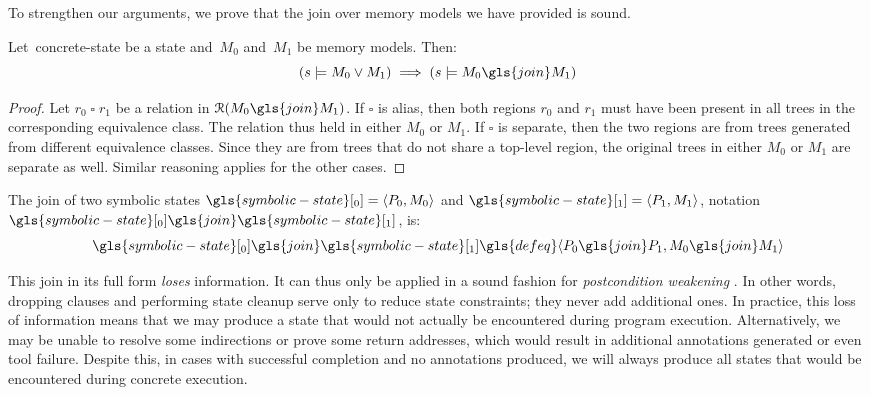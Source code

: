 To strengthen our arguments, we prove that the join over memory models we have provided is sound.
\begin{lemma}\label{lem:mem_soundness}
  Let~\gls{concrete-state} be a state and~$M_0$ and~$M_1$ be memory models. Then:
  \begin{equation*}
    (s\models M_0 \lor M_1) \implies (s\models M_0\gls{join}M_1)
  \end{equation*}
\end{lemma}
\begin{proof}
  Let $r_0\mathbin{\square}r_1$ be a relation in $\mathcal{R}(M_0\gls{join}M_1)$.
  If $\square$ is \gls{alias}, then both regions $r_0$ and $r_1$ must have been present in all trees in the corresponding equivalence class.
  The relation thus held in either $M_0$ or $M_1$.
  If $\square$ is \gls{separate}, then the two regions are from trees generated from different equivalence classes. Since they are from trees that do not share a top-level region, the original trees in either $M_0$ or $M_1$ are separate as well.
  Similar reasoning applies for the other cases.
\end{proof}

\begin{definition}
  The join of two symbolic states $\gls{symbolic-state}[_0]=\langle P_0,M_0\rangle$
  and $\gls{symbolic-state}[_1]=\langle P_1,M_1\rangle$, notation $\gls{symbolic-state}[_0]\gls{join}\gls{symbolic-state}[_1]$, is:
  \begin{equation*}
    \gls{symbolic-state}[_0]\gls{join}\gls{symbolic-state}[_1]\gls{defeq}\langle P_0\gls{join}P_1,M_0\gls{join}M_1\rangle
  \end{equation*}
\end{definition}

\begin{remark}
  This join in its full form \emph{loses} information.
  It can thus only be applied in a sound fashion for \emph{postcondition weakening} \autocite{hoare1969axiomatic}.
  In other words, dropping clauses and performing state cleanup
  serve only to reduce state constraints; they never add additional ones.
  In practice, this loss of information means that we may produce a state
  that would not actually be encountered during program execution.
  Alternatively, we may be unable to resolve some indirections or prove some return addresses, which would result in additional annotations generated or even tool failure.
  Despite this, in cases with successful completion and no annotations produced,
  we will always produce all states that would be encountered during concrete execution.
\end{remark}


